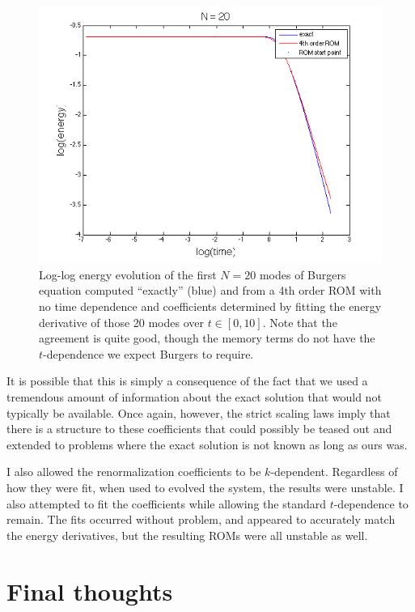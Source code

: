 \documentclass{article}
\begin{document}
\begin{figure}[h]
\includegraphics[width=\textwidth]{burgers_20.png}
\caption{Log-log energy evolution of the first $N=20$ modes of Burgers equation computed ``exactly'' (blue) and from a 4th order ROM with no time dependence and coefficients determined by fitting the energy derivative of those 20 modes over $t\in[0,10]$. Note that the agreement is quite good, though the memory terms do not have the $t$-dependence we expect Burgers to require.}\label{fig:burgers_20}
\end{figure}



It is possible that this is simply a consequence of the fact that we used a tremendous amount of information about the exact solution that would not typically be available. Once again, however, the strict scaling laws imply that there is a structure to these coefficients that could possibly be teased out and extended to problems where the exact solution is not known as long as ours was.

I also allowed the renormalization coefficients to be $k$-dependent. Regardless of how they were fit, when used to evolved the system, the results were unstable. I also attempted to fit the coefficients while allowing the standard $t$-dependence to remain. The fits occurred without problem, and appeared to accurately match the energy derivatives, but the resulting ROMs were all unstable as well.


\section{Final thoughts}
\end{document}
